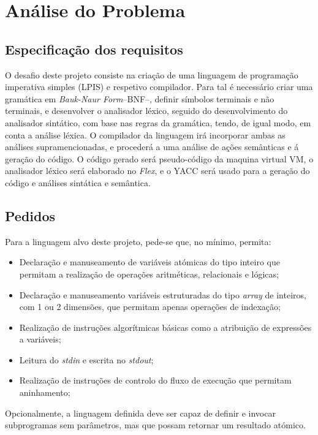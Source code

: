 \chapter{Análise do Problema}
\label{cap:analise}


\section{Especificação dos requisitos}
\label{sec:especificacao:analise}

O desafio deste projeto consiste na criação de uma linguagem de programação
imperativa simples (LPIS) e respetivo compilador.  Para tal é necessário criar
uma gramática em \emph{Bauk-Naur Form}--BNF--, definir símbolos terminais e não
terminais, e desenvolver o analisador léxico, seguido do desenvolvimento do
analisador sintático, com base nas regras da gramática, tendo, de igual modo, em conta
a análise léxica. O compilador da linguagem irá incorporar ambas as análises
supramencionadas, e procederá a uma análise de ações semânticas e á geração do
código.  O código gerado será pseudo-código da maquina virtual VM, o analisador
léxico será elaborado no \emph{Flex}, e o YACC será usado para a geração do
código e análises sintática e semântica.   


\section{Pedidos}

Para a linguagem alvo deste projeto, pede-se que, no mínimo, permita:


\begin{itemize}
\item Declaração e manuseamento de variáveis atómicas do tipo inteiro que
	permitam a realização de operações aritméticas, relacionais e lógicas;
\item Declaração e manuseamento variáveis estruturadas do tipo \emph{array} de
	inteiros, com 1 ou 2 dimensões, que permitam apenas operações de indexação;
\item Realização de instruções algorítmicas básicas como a atribuição de
	expressões a variáveis;
\item Leitura do \emph{stdin} e escrita no \emph{stdout};
\item Realização de instruções de controlo do fluxo de execução que permitam
	aninhamento;
\end{itemize}

Opcionalmente, a linguagem definida deve ser capaz de definir e invocar
subprogramas sem parâmetros, mas que possam retornar um resultado atómico.


